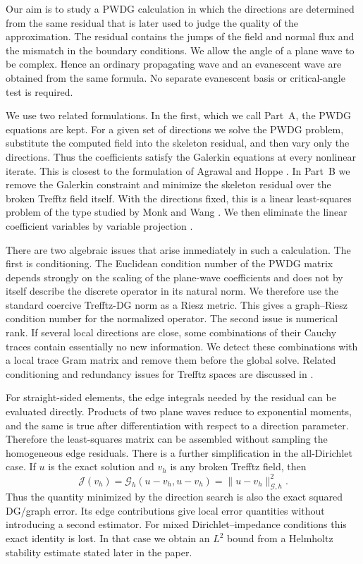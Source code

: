 \documentclass[pdflatex,sn-mathphys-num]{sn-jnl}
\theoremstyle{thmstyleone}
\theoremstyle{thmstyletwo}
\begin{document}
Our aim is to study a PWDG calculation in which the directions are determined from the same residual that is later used to judge the quality of the approximation.  The residual contains the jumps of the field and normal flux and the mismatch in the boundary conditions.  We allow the angle of a plane wave to be complex.  Hence an ordinary propagating wave and an evanescent wave are obtained from the same formula.  No separate evanescent basis or critical-angle test is required.

We use two related formulations.  In the first, which we call Part~A, the PWDG equations are kept.  For a given set of directions we solve the PWDG problem, substitute the computed field into the skeleton residual, and then vary only the directions.  Thus the coefficients satisfy the Galerkin equations at every nonlinear iterate.  This is closest to the formulation of Agrawal and Hoppe \cite{AgrawalHoppe2017}.  In Part~B we remove the Galerkin constraint and minimize the skeleton residual over the broken Trefftz field itself.  With the directions fixed, this is a linear least-squares problem of the type studied by Monk and Wang \cite{MonkWang1999}.  We then eliminate the linear coefficient variables by variable projection \cite{GolubPereyra1973}.

There are two algebraic issues that arise immediately in such a calculation.  The first is conditioning.  The Euclidean condition number of the PWDG matrix depends strongly on the scaling of the plane-wave coefficients and does not by itself describe the discrete operator in its natural norm.  We therefore use the standard coercive Trefftz-DG norm as a Riesz metric.  This gives a graph--Riesz condition number for the normalized operator.  The second issue is numerical rank.  If several local directions are close, some combinations of their Cauchy traces contain essentially no new information.  We detect these combinations with a local trace Gram matrix and remove them before the global solve.  Related conditioning and redundancy issues for Trefftz spaces are discussed in \cite{BarucqBendaliDiazTordeux2021,BetckeTrefethen2005,BarnettBetcke2008,ParolinHuybrechsMoiola2023}.

For straight-sided elements, the edge integrals needed by the residual can be evaluated directly.  Products of two plane waves reduce to exponential moments, and the same is true after differentiation with respect to a direction parameter.  Therefore the least-squares matrix can be assembled without sampling the homogeneous edge residuals.  There is a further simplification in the all-Dirichlet case.  If $u$ is the exact solution and $v_h$ is any broken Trefftz field, then
\[
 \mathcal J(v_h)=\mathcal G_h(u-v_h,u-v_h)=\|u-v_h\|_{\mathcal G,h}^2.
\]
Thus the quantity minimized by the direction search is also the exact squared DG/graph error.  Its edge contributions give local error quantities without introducing a second estimator.  For mixed Dirichlet--impedance conditions this exact identity is lost.  In that case we obtain an $L^2$ bound from a Helmholtz stability estimate stated later in the paper.
\end{document}
